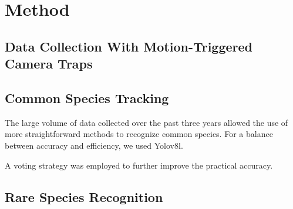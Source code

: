 \section{Method}

\subsection{Data Collection With Motion-Triggered Camera Traps}



\subsection{Common Species Tracking}

The large volume of data collected over the past three years allowed the use of more straightforward methods to recognize common species. For a balance between accuracy and efficiency, we used Yolov8l\cite{vargheseYOLOv8NovelObject2024}.

A voting strategy was employed to further improve the practical accuracy. 

\subsection{Rare Species Recognition}

